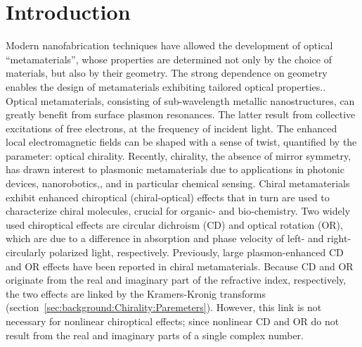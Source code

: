\section{Introduction}\label{sec:results:OAinPlanarNanohelices:introduction}
Modern nanofabrication techniques have allowed the development of optical “metamaterials”, whose properties are determined not only by the choice of materials, but also by their geometry. The strong dependence on geometry enables the design of metamaterials exhibiting tailored optical properties.\cite{Pendry2004a, Alu2007, Kauranen2012, Meinzer2014, Moitra2015, Cong2015, Prudencio2016}. 
Optical metamaterials, consisting of sub-wavelength metallic nanostructures, can greatly benefit from surface plasmon resonances. The latter result from collective excitations of free electrons, at the frequency of incident light. The enhanced local electromagnetic fields can be shaped with a sense of twist, quantified by the parameter: optical chirality.\cite{Tang2010, Schaferling2012}
Recently, chirality, the absence of mirror symmetry, has drawn interest to plasmonic metamaterials due to applications in photonic devices,\cite{Rizza2015, Esposito2016, Hou2016} nanorobotics,\cite{Urban2015, Schamel2013a}, and in particular chemical sensing.
Chiral metamaterials exhibit enhanced chiroptical (chiral-optical) effects\cite{Schaferling2014, Karimullah2015, Canaguier-Durand2014} that in turn are used to characterize chiral molecules, crucial for organic- and bio-chemistry.\cite{Zhao2017, Hendry2010, Tullius2015}
Two widely used chiroptical effects are circular dichroism (CD) and optical rotation (OR), which are due to a difference in absorption and phase velocity of left- and right- circularly polarized light, respectively. Previously, large plasmon-enhanced CD and OR effects have been reported in chiral metamaterials.\cite{Papakostas2003, Kuwata-Gonokami2005a, Decker2007, Plum2007, Gansel2011}
Because CD and OR originate from the real and imaginary part of the refractive index, respectively, the two effects are linked by the Kramers-Kronig transforms (section~\ref{sec:background:Chirality:Paremeters}).\cite{Barron2004, Parson2007, Govorov2011}
However, this link is not necessary for nonlinear chiroptical effects; since nonlinear CD and OR do not result from the real and imaginary parts of a single complex number.

